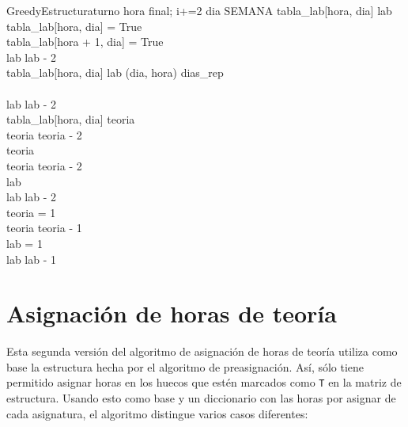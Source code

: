 \begin{pseudocode}{GreedyEstructura}{turno}
   		\FOR hora  \TO final; i+=2 \DO
   		\BEGIN
   		   \FOR dia \in SEMANA \DO
           \BEGIN
                \IF \NOT tabla\_lab[hora, dia] \AND lab  \THEN
                \BEGIN
                    \\
                    tabla\_lab[hora, dia] = True\\
                    tabla\_lab[hora + 1, dia] = True\\
                    lab \GETS lab - 2\\
                \END
                \ELSEIF tabla\_lab[hora, dia] \AND lab  \AND (dia, hora) \in dias\_rep \THEN
                \BEGIN
                    \\
                    \\
                    lab \GETS lab - 2\\
                \END
                \ELSEIF tabla\_lab[hora, dia] \AND teoria  \THEN
                \BEGIN
                    \\
                    teoria \GETS teoria - 2\\
                \END
                \ELSEIF teoria  \THEN
                \BEGIN
                    \\
                    teoria \GETS teoria - 2\\
                \END
                \ELSEIF lab  \THEN
                \BEGIN
                    \\
                    lab \GETS lab - 2\\
                \END
                \ELSEIF teoria = 1 \THEN
                \BEGIN
                  \\
                  teoria \GETS teoria - 1\\
                \END
                \ELSEIF lab = 1 \THEN
                \BEGIN
                  \\
                  lab \GETS lab - 1\\
                \END
                \ELSE {}
           \END
   		\END
   	\END
\END
\end{pseudocode}

\section{Asignación de horas de teoría}
Esta segunda versión del algoritmo de asignación de horas de teoría utiliza como base la estructura hecha por el algoritmo de preasignación. Así, sólo tiene permitido asignar horas en los huecos que estén marcados como \texttt{T} en la matriz de estructura. Usando esto como base y un diccionario con las horas por asignar de cada asignatura, el algoritmo distingue varios casos diferentes:


